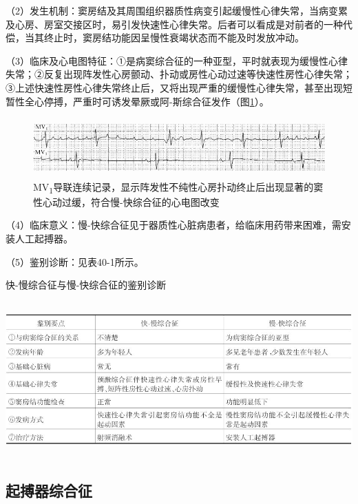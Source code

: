 （2）发生机制：窦房结及其周围组织器质性病变引起缓慢性心律失常，当病变累及心房、房室交接区时，易引发快速性心律失常。后者可以看成是对前者的一种代偿，当其终止时，窦房结功能因呈慢性衰竭状态而不能及时发放冲动。

（3）临床及心电图特征：①是病窦综合征的一种亚型，平时就表现为缓慢性心律失常；②反复出现阵发性心房颤动、扑动或房性心动过速等快速性房性心律失常；③上述快速性房性心律失常终止后，又将出现严重的缓慢性心律失常，甚至出现短暂性全心停搏，严重时可诱发晕厥或阿-斯综合征发作（图\ref{fig40-12}）。

\begin{figure}[!htbp]
 \centering
 \includegraphics[width=5.58333in,height=0.89583in]{./images/Image00673.jpg}
 \captionsetup{justification=centering}
 \caption{MV\textsubscript{1}导联连续记录，显示阵发性不纯性心房扑动终止后出现显著的窦性心动过缓，符合慢-快综合征的心电图改变}
 \label{fig40-12}
  \end{figure} 


（4）临床意义：慢-快综合征见于器质性心脏病患者，给临床用药带来困难，需安装人工起搏器。

（5）鉴别诊断：见表40-1所示。

\begin{table}[htbp]
\centering
\caption{快-慢综合征与慢-快综合征的鉴别诊断}
\label{tab40-1}
\includegraphics[width=6.23958in,height=2.35417in]{./images/Image00674.jpg}
\end{table}

\protect\hypertarget{text00047.htmlux5cux23subid560}{}{}

\subsection{起搏器综合征}

